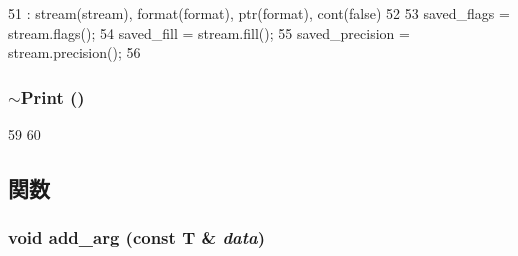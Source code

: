 \begin{DoxyCode}
51     : stream(stream), format(format), ptr(format), cont(false)
52 {
53     saved_flags = stream.flags();
54     saved_fill = stream.fill();
55     saved_precision = stream.precision();
56 }
\end{DoxyCode}
\hypertarget{structcp_1_1Print_a01f5243d7613ac5562749ebddfdeae13}{
\subsubsection[{$\sim$Print}]{\setlength{\rightskip}{0pt plus 5cm}$\sim${\bf Print} ()}}
\label{structcp_1_1Print_a01f5243d7613ac5562749ebddfdeae13}



\begin{DoxyCode}
59 {
60 }
\end{DoxyCode}


\subsection{関数}
\hypertarget{structcp_1_1Print_a1b90bbb1a9c690bf6a6688f386a20b99}{
\subsubsection[{add\_\-arg}]{\setlength{\rightskip}{0pt plus 5cm}void add\_\-arg (const T \& {\em data})}}
\label{structcp_1_1Print_a1b90bbb1a9c690bf6a6688f386a20b99}



